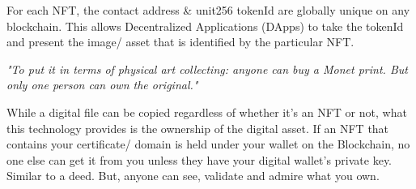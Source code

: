 \documentclass[a4paper, 12pt, oneside]{report}
\begin{document}
For each NFT, the contact address \& unit256 tokenId are globally unique on any blockchain. This allows Decentralized Applications (DApps) \autocite{frankenfield_decentralized_nodate, noauthor_decentralized_2021} to take the tokenId and present the image/ asset that is identified by the particular NFT.

\emph{"To put it in terms of physical art collecting: anyone can buy a Monet print. But only one person can own the original."} \autocite{clark_people_2021}

While a digital file can be copied regardless of whether it's an NFT or not, what this technology provides is the ownership of the digital asset.
If an NFT that contains your certificate/ domain is held under your wallet on the Blockchain, no one else can get it from you unless they have your digital wallet's private key. Similar to a deed. But, anyone can see, validate and admire what you own.





\end{document}
